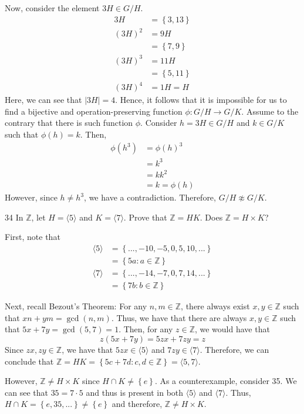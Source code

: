 \begin{hwproblem}
Now, consider the element \(3H \in G/H\).
\[
\begin{aligned}
    3H &= \left\{3, 13\right\} \\
    (3H)^2 &= 9H \\
           &= \left\{7, 9\right\} \\
    (3H)^3 &= 11H \\
           &= \left\{5, 11\right\} \\
    (3H)^4 &= 1H = H
\end{aligned}
\]
Here, we can see that \(|3H| = 4\). Hence, it follows that it is impossible for us to find a bijective and operation-preserving function \(\phi : G/H \to G/K\). Assume to the contrary that there is such function \(\phi\). Consider \(h = 3H \in G/H\) and \(k \in G/K\) such that \(\phi(h) = k\). Then,
\[
\begin{aligned}
    \phi(h^3) &= \phi(h)^3 \\
              &= k^3 \\
              &= kk^2 \\
              &= k = \phi(h)
\end{aligned}
\]
However, since \(h \neq h^3\), we have a contradiction. Therefore, \(G/H \napprox G/K\).
\end{hwproblem}

\begin{hwproblem}
{34}{
    In \(\mathbb{Z}\), let \(H = \langle 5 \rangle\) and \(K = \langle 7 \rangle\). Prove that \(\mathbb{Z} = HK\). Does \(\mathbb{Z} = H \times K\)?
}

First, note that
\[
\begin{aligned}
    \langle 5 \rangle &= \left\{..., -10, -5, 0, 5, 10, ...\right\} \\
                      &= \left\{5a : a \in \mathbb{Z}\right\} \\
    \langle 7 \rangle &= \left\{..., -14, -7, 0, 7, 14, ...\right\} \\
                      &= \left\{7b : b \in \mathbb{Z}\right\}
\end{aligned}
\]

Next, recall Bezout's Theorem: For any \(n, m \in \mathbb{Z}\), there always exist \(x, y \in \mathbb{Z}\) such that \(xn + ym = \gcd(n, m)\). Thus, we have that there are always \(x, y \in \mathbb{Z}\) such that \(5x + 7y = \gcd(5, 7) = 1\). Then, for any \(z \in \mathbb{Z}\), we would have that 
\[
    z(5x + 7y) = 5zx + 7zy = z
\]
Since \(zx, zy \in \mathbb{Z}\), we have that \(5zx \in \langle 5 \rangle\) and \(7zy \in \langle 7 \rangle\). Therefore, we can conclude that \(\mathbb{Z} = HK = \left\{5c + 7d : c, d \in \mathbb{Z}\right\} = \langle 5, 7 \rangle\).

However, \(\mathbb{Z} \neq H \times K\) since \(H \cap K \neq \left\{e\right\}\). As a counterexample, consider 35. We can see that \(35 = 7 \cdot 5\) and thus is present in both \(\langle 5 \rangle\) and \(\langle 7 \rangle\). Thus, \(H \cap K = \left\{e, 35, ...\right\} \neq \left\{e\right\}\) and therefore, \(\mathbb{Z} \neq H \times K\).
\end{hwproblem}

